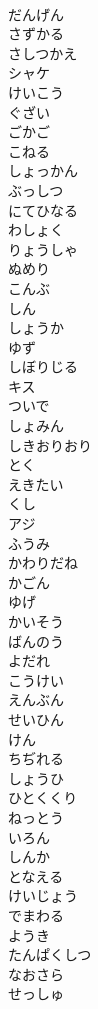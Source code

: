 \documentclass[8pt]{extreport}
\begin{document}
\begin{CJK}{UTF8}{min}
\\	だんげん
\\	さずかる
\\	さしつかえ
\\	シャケ
\\	けいこう
\\	ぐざい
\\	ごかご
\\	こねる
\\	しょっかん
\\	ぶっしつ
\\	にてひなる
\\	わしょく
\\	りょうしゃ
\\	ぬめり
\\	こんぶ 
\\	しん
\\	しょうか
\\	ゆず
\\	しぼりじる
\\	キス
\\	ついで
\\	しょみん
\\	しきおりおり
\\	とく
\\	えきたい
\\	くし
\\	アジ
\\	ふうみ
\\	かわりだね
\\	かごん
\\	ゆげ
\\	かいそう
\\	ばんのう
\\	よだれ
\\	こうけい
\\	えんぶん
\\	せいひん
\\	けん
\\	ちぢれる
\\	しょうひ
\\	ひとくくり
\\	ねっとう
\\	いろん
\\	しんか
\\	となえる
\\	けいじょう
\\	でまわる
\\	ようき
\\	たんぱくしつ
\\	なおさら
\\	せっしゅ

\end{CJK}
\end{document}
